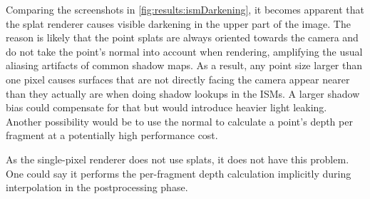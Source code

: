 Comparing the screenshots in \cref{fig:results:ismDarkening}, it becomes apparent that the splat renderer causes visible darkening in the upper part of the image. The reason is likely that the point splats are always oriented towards the camera and do not take the point's normal into account when rendering, amplifying the usual aliasing artifacts of common shadow maps. As a result, any point size larger than one pixel causes surfaces that are not directly facing the camera appear nearer than they actually are when doing shadow lookups in the ISMs. A larger shadow bias could compensate for that but would introduce heavier light leaking. Another possibility would be to use the normal to calculate a point's depth per fragment at a potentially high performance cost.

As the single-pixel renderer does not use splats, it does not have this problem. One could say it performs the per-fragment depth calculation implicitly during interpolation in the postprocessing phase.



